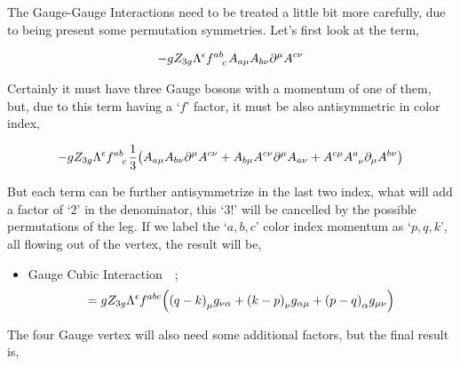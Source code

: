  The Gauge-Gauge Interactions need to be treated a little bit more carefully, due to being present some permutation symmetries. Let's first look at the term,

\begin{align}
    -gZ_{3g}\Lambda^\epsilon\tensor{f}{^a^b_c}A_{a\mu}A_{b\nu}\partial^\mu A^{c\nu}\nonumber
\end{align}

Certainly it must have three Gauge bosons with a momentum of one of them, but, due to this term having a `$f$' factor, it must be also antisymmetric in color index,

\begin{align}
    -gZ_{3g}\Lambda^\epsilon\tensor{f}{^a^b_c}\frac{1}{3}\qty(A_{a\mu}A_{b\nu}\partial^\mu A^{c\nu}+A_{b\mu}A^{c\nu}\partial^\mu A_{a\nu}+A^{c\mu}\tensor{A}{^a_\nu}\partial_\mu A^{b\nu})\nonumber
\end{align}

But each term can be further antisymmetrize in the last two index, what will add a factor of `$2$' in the denominator, this `$3!$' will be cancelled by the possible permutations of the leg. If we label the `$a,b,c$' color index momentum as `$p,q,k$', all flowing out of the vertex, the result will be,

\begin{itemize}
    \item Gauge Cubic Interaction\ \ ; \begin{align}=gZ_{3g}\Lambda^\epsilon f^{abc}\qty(\qty(q-k)_\mu g_{\nu\alpha}+\qty(k-p)_\nu g_{\alpha\mu}+\qty(p-q)_\alpha g_{\mu\nu})\end{align}
\end{itemize}

The four Gauge vertex will also need some additional factors, but the final result is,

